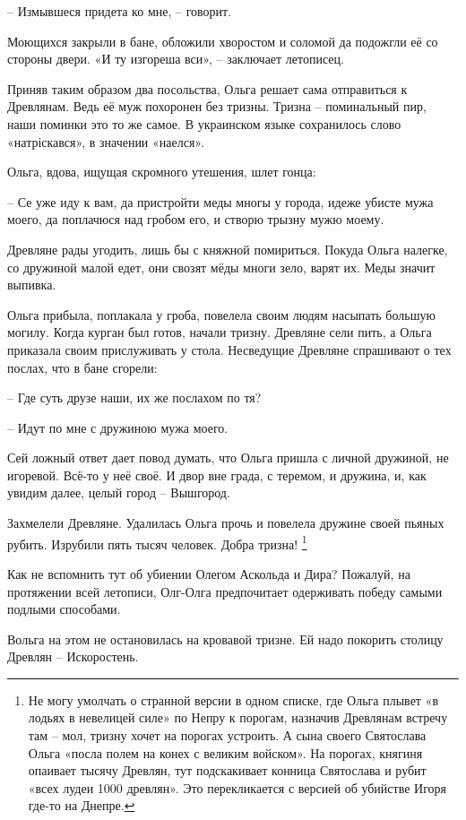    – Измывшеся придета ко мне, – говорит.

Моющихся закрыли в бане, обложили хворостом и соломой да подожгли её со стороны двери. «И ту изгореша вси», – заключает летописец. 

Приняв таким образом два посольства, Ольга решает сама отправиться к Древлянам. Ведь её муж похоронен без тризны. Тризна – поминальный пир, наши поминки это то же самое. В украинском языке сохранилось слово «натріскався», в значении «наелся».

Ольга, вдова, ищущая скромного утешения, шлет гонца:

   – Се уже иду к вам, да пристройти меды многы у города, идеже убисте мужа моего, да поплачюся над гробом его, и створю трызну мужю моему.

Древляне рады угодить, лишь бы с княжной помириться. Покуда Ольга налегке, со дружиной малой едет, они свозят мёды многи зело, варят их. Меды значит выпивка.

Ольга прибыла, поплакала у гроба, повелела своим людям насыпать большую могилу. Когда курган был готов, начали тризну. Древляне сели пить, а Ольга приказала своим прислуживать у стола. Несведущие Древляне спрашивают о тех послах, что в бане сгорели:

   – Где суть друзе наши, их же послахом по тя?

   – Идут по мне с дружиною мужа моего.

Сей ложный ответ дает повод думать, что Ольга пришла с личной дружиной, не игоревой. Всё-то у неё своё. И двор вне града, с теремом, и дружина, и, как увидим далее, целый город – Вышгород.

Захмелели Древляне. Удалилась Ольга прочь и повелела дружине своей пьяных рубить. Изрубили пять тысяч человек. Добра тризна!
\footnote{Не могу умолчать о странной версии в одном списке, где Ольга плывет «в лодьях в невелицей силе» по Непру к порогам, назначив Древлянам встречу там – мол, тризну хочет на порогах устроить. А сына своего Святослава Ольга «посла полем на конех с великим войском». На порогах, княгиня опаивает тысячу Древлян, тут подскакивает конница Святослава и рубит «всех лудеи 1000 древлян». Это перекликается с версией об убийстве Игоря где-то на Днепре.}

Как не вспомнить тут об убиении Олегом Аскольда и Дира? Пожалуй, на протяжении всей летописи, Олг-Олга предпочитает одерживать победу самыми подлыми способами.

Вольга на этом не остановилась на кровавой тризне. Ей надо покорить столицу Древлян – Искоростень.

